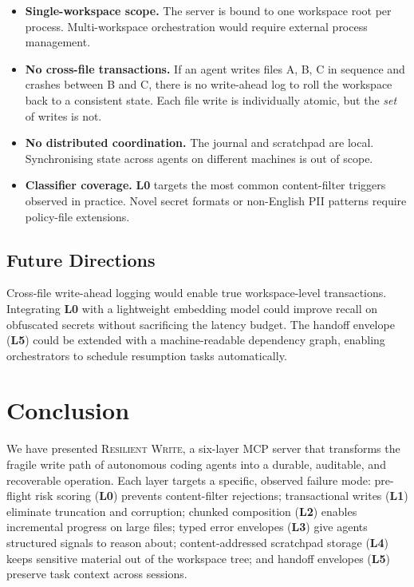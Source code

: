 \documentclass[11pt,twocolumn]{article}
\newcommand{\layer}[1]{\textbf{L#1}}
\begin{document}
\begin{itemize}[nosep]
  \item \textbf{Single-workspace scope.}  The server is bound to
    one workspace root per process.  Multi-workspace orchestration
    would require external process management.
  \item \textbf{No cross-file transactions.}  If an agent writes
    files A, B, C in sequence and crashes between B and C, there
    is no write-ahead log to roll the workspace back to a
    consistent state.  Each file write is individually atomic, but
    the \emph{set} of writes is not.
  \item \textbf{No distributed coordination.}  The journal and
    scratchpad are local.  Synchronising state across agents on
    different machines is out of scope.
  \item \textbf{Classifier coverage.}  \layer{0} targets the most
    common content-filter triggers observed in practice.  Novel
    secret formats or non-English PII patterns require policy-file
    extensions.
\end{itemize}

\subsection{Future Directions}

Cross-file write-ahead logging would enable true workspace-level
transactions.  Integrating \layer{0} with a lightweight
embedding model could improve recall on obfuscated secrets without
sacrificing the latency budget.  The handoff envelope
(\layer{5}) could be extended with a machine-readable dependency
graph, enabling orchestrators to schedule resumption tasks
automatically.

\section{Conclusion}
\label{sec:conclusion}

We have presented \textsc{Resilient Write}, a six-layer MCP server
that transforms the fragile write path of autonomous coding agents
into a durable, auditable, and recoverable operation.  Each layer
targets a specific, observed failure mode: pre-flight risk scoring
(\layer{0}) prevents content-filter rejections; transactional writes
(\layer{1}) eliminate truncation and corruption; chunked composition
(\layer{2}) enables incremental progress on large files; typed error
envelopes (\layer{3}) give agents structured signals to reason about;
content-addressed scratchpad storage (\layer{4}) keeps sensitive
material out of the workspace tree; and handoff envelopes (\layer{5})
preserve task context across sessions.
\end{document}
